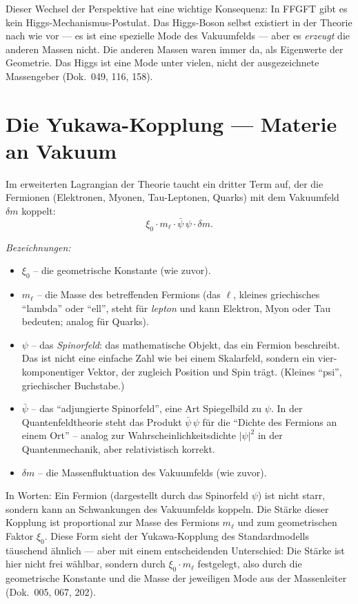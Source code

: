 Dieser Wechsel der Perspektive hat eine wichtige Konsequenz: In
FFGFT gibt es kein Higgs-Mechanismus-Postulat. Das Higgs-Boson selbst
existiert in der Theorie nach wie vor --- es ist eine spezielle Mode
des Vakuumfelds --- aber es \emph{erzeugt} die anderen Massen nicht.
Die anderen Massen waren immer da, als Eigenwerte der Geometrie. Das
Higgs ist eine Mode unter vielen, nicht der ausgezeichnete
Massengeber (Dok.~049, 116, 158).

\section{Die Yukawa-Kopplung --- Materie an Vakuum}

Im erweiterten Lagrangian der Theorie taucht ein dritter Term auf,
der die Fermionen (Elektronen, Myonen, Tau-Leptonen, Quarks) mit dem
Vakuumfeld $\delta m$ koppelt:
\[
  \xi_0 \cdot m_\ell \cdot \bar\psi\,\psi \cdot \delta m.
\]

\noindent\textit{Bezeichnungen:}
\begin{itemize}\setlength\itemsep{0pt}
  \item $\xi_0$ -- die geometrische Konstante (wie zuvor).
  \item $m_\ell$ -- die Masse des betreffenden Fermions (das
        $\ell$, kleines griechisches \enquote{lambda} oder \enquote{ell},
        steht für \emph{lepton} und kann Elektron, Myon oder Tau bedeuten;
        analog für Quarks).
  \item $\psi$ -- das \emph{Spinorfeld}: das mathematische Objekt, das
        ein Fermion beschreibt. Das ist nicht eine einfache Zahl wie
        bei einem Skalarfeld, sondern ein vier-komponentiger Vektor,
        der zugleich Position und Spin trägt. (Kleines \enquote{psi},
        griechischer Buchstabe.)
  \item $\bar\psi$ -- das \enquote{adjungierte Spinorfeld}, eine Art
        Spiegelbild zu $\psi$. In der Quantenfeldtheorie steht das
        Produkt $\bar\psi\,\psi$ für die \enquote{Dichte des Fermions
        an einem Ort} -- analog zur Wahrscheinlichkeitsdichte
        $|\psi|^2$ in der Quantenmechanik, aber relativistisch korrekt.
  \item $\delta m$ -- die Massenfluktuation des Vakuumfelds (wie zuvor).
\end{itemize}

\medskip\noindent
In Worten: Ein Fermion (dargestellt durch das Spinorfeld $\psi$) ist
nicht starr, sondern kann an Schwankungen des Vakuumfelds koppeln.
Die Stärke dieser Kopplung ist proportional zur Masse des Fermions
$m_\ell$ und zum geometrischen Faktor $\xi_0$. Diese Form sieht der
Yukawa-Kopplung des Standardmodells täuschend ähnlich --- aber mit
einem entscheidenden Unterschied: Die Stärke ist hier nicht frei
wählbar, sondern durch $\xi_0 \cdot m_\ell$ festgelegt, also durch
die geometrische Konstante und die Masse der jeweiligen Mode aus der
Massenleiter (Dok.~005, 067, 202).

